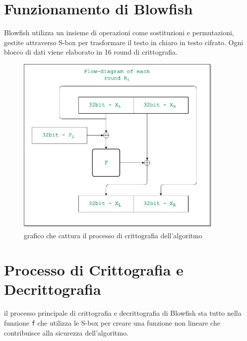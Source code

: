 \documentclass[a4paper,12pt]{report}
\begin{document}
		\section{Funzionamento di Blowfish}

		Blowfish utilizza un insieme di operazioni come sostituzioni e permutazioni,
		gestite attraverso S-box per trasformare il testo in chiaro in
		testo cifrato. Ogni blocco di dati viene elaborato in 16 round di
		crittografia.
		\begin{figure}[H]
			\centering
			\includegraphics[width=0.9\textwidth]{encription.jpg}
			\caption{grafico che cattura il processo di crittografia dell'algoritmo \cite{blowfish-algorithm}}
			\label{fig:encription}
		\end{figure}


		\section*{Processo di Crittografia e Decrittografia}
		il processo principale di crittografia e decrittografia di Blowfish sta tutto 
		nella funzione \texttt{f} che utilizza le S-box per creare una funzione non
		lineare che contribuisce alla sicurezza dell'algoritmo.
\end{document}
